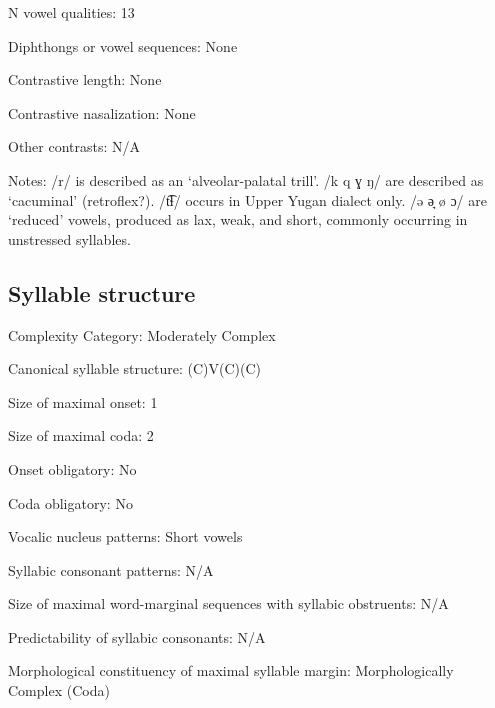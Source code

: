 {\begin{appendixdesc}
\item[N vowel qualities:] 13

\item[Diphthongs or vowel sequences:] None

\item[Contrastive length:] None

\item[Contrastive nasalization:] None

\item[Other contrasts:] N/A

\item[Notes:] /r/ is described as an ‘alveolar-palatal trill’. /k q ɣ ŋ/ are described as ‘cacuminal’ (retroflex?). /t͡ɬ/ occurs in Upper Yugan dialect only. /ə ə̘ ø ɔ/ are ‘reduced’ vowels, produced as lax, weak, and short, commonly occurring in unstressed syllables.
\end{appendixdesc}
\subsection*{Syllable structure}
\begin{appendixdesc}

\item[Complexity Category:] Moderately Complex

\item[Canonical syllable structure:] (C)V(C)(C) \citep[53--57]{Filchenko2007}

\item[Size of maximal onset:] 1

\item[Size of maximal coda:] 2

\item[Onset obligatory:] No

\item[Coda obligatory:] No

\item[Vocalic nucleus patterns:] Short vowels

\item[Syllabic consonant patterns:] N/A

\item[Size of maximal word-marginal sequences with syllabic obstruents:] N/A

\item[Predictability of syllabic consonants:] N/A

\item[Morphological constituency of maximal syllable margin:] Morphologically Complex (Coda)


\end{appendixdesc}}
